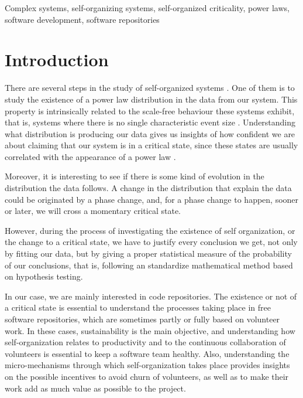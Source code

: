 \documentclass[conference]{IEEEtran}
\begin{document}
\begin{IEEEkeywords}
  Complex systems, self-organizing systems, self-organized
  criticality, power laws, software development, software repositories
\end{IEEEkeywords}


\section{Introduction}\label{introduction}

There are several steps in the study of self-organized systems
\cite{bak1988self}. One of them is to study the existence of a
power law distribution in the data from our system. This property is
intrinsically related to the scale-free behaviour these systems
exhibit, that is, systems where there is no single characteristic
event size \cite{golyk20self}.  Understanding what distribution is
producing our data gives us insights of how confident we are about
claiming that our system is in a critical state, since these states
are usually correlated with the appearance of a power law
\cite{newman2005power}.

Moreover, it is interesting to see if there is some kind of evolution
in the distribution the data follows.  A change in the distribution
that explain the data could be originated by a phase change, and, for
a phase change to happen, sooner or later, we will cross a momentary
critical
state. %

However, during the process of investigating the existence of self
organization, or the change to a critical state, we have to justify
every conclusion we get, not only by fitting our data, but by giving a
proper statistical measure of the probability of our conclusions, that
is, following an standardize mathematical method based on hypothesis
testing.

In our case, we are mainly interested in code repositories. The
existence or not of a critical state is essential to understand the
processes taking place in free software repositories, which are
sometimes partly or fully based on volunteer work. In these cases,
sustainability is the main objective, and understanding how
self-organization relates to productivity and to the continuous
collaboration of volunteers is essential to keep a software team
healthy. Also, understanding the micro-mechanisms through which
self-organization takes place provides insights on the possible
incentives to avoid churn of volunteers, as well as to make their work
add as much value as possible to the project.
\end{document}
